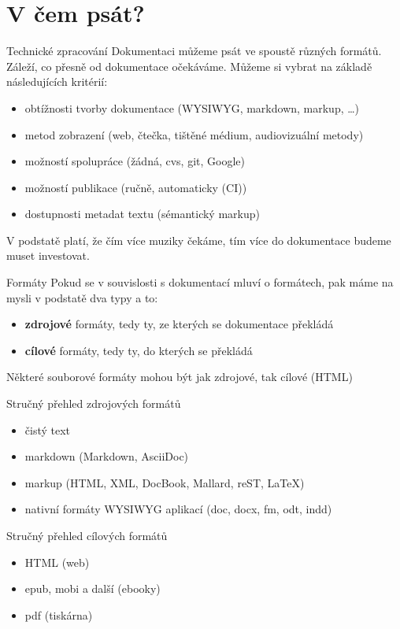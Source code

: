 \documentclass[12pt,a4paper]{beamer}
\begin{document}
	\section{V čem psát?}

	\begin{frame}{Technické zpracování}
	Dokumentaci můžeme psát ve spoustě různých formátů. Záleží, co přesně od dokumentace očekáváme. Můžeme si vybrat na základě následujících kritérií:
	\begin{itemize}
		\item obtížnosti tvorby dokumentace (WYSIWYG, markdown, markup, \ldots{})
		\item metod zobrazení (web, čtečka, tištěné médium, audiovizuální metody)
		\item možností spolupráce (žádná, cvs, git, Google)
		\item možností publikace (ručně, automaticky (CI))
		\item dostupnosti metadat textu (sémantický markup)
	\end{itemize}
	V podstatě platí, že čím více muziky čekáme, tím více do dokumentace budeme muset investovat.
	\end{frame}

	\begin{frame}{Formáty}
	Pokud se v souvislosti s dokumentací mluví o formátech, pak máme na mysli v podstatě dva typy a to:
		\begin{itemize}
			\item \textbf{zdrojové} formáty, tedy ty, ze kterých se dokumentace překládá
			\item \textbf{cílové} formáty, tedy ty, do kterých se překládá
		\end{itemize}
	Některé souborové formáty mohou být jak zdrojové, tak cílové (HTML)
	\end{frame}

	\begin{frame}{Stručný přehled zdrojových formátů}
		\begin{itemize}
			\item čistý text
			\item markdown (Markdown, AsciiDoc)
			\item markup (HTML, XML, DocBook, Mallard, reST, \LaTeX)
			\item nativní formáty WYSIWYG aplikací (doc, docx, fm, odt, indd)
		\end{itemize}
	\end{frame}

	\begin{frame}{Stručný přehled cílových formátů}
		\begin{itemize}
			\item HTML (web)
			\item epub, mobi a další (ebooky)
			\item pdf (tiskárna)
		\end{itemize}
	\end{frame}
\end{document}
